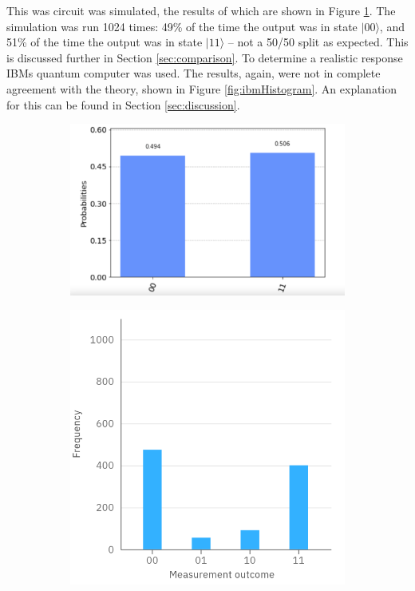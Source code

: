 This was circuit was simulated, the results of which are shown in Figure \ref{fig:qiskitHistogram}. The simulation was run 1024 times: 49\% of the time the output was in state $|00\rangle$, and 51\% of the time the output was in state $|11\rangle$ -- not a 50/50 split as expected. This is discussed further in Section \ref{sec:comparison}. To determine a realistic response IBMs quantum computer was used. The results, again, were not in complete agreement with the theory, shown in Figure \ref{fig:ibmHistogram}. An explanation for this can be found in Section \ref{sec:discussion}.

\begin{figure}[h]
    \centering
    \begin{subfigure}[h]{0.5\textwidth}
        \includegraphics[width=\textwidth]{lab2/images/qiskitHistogram.png}
        \caption{} 
        \label{fig:qiskitHistogram}
    \end{subfigure}
    \hfill
    \begin{subfigure}[h]{0.43\textwidth}
        \includegraphics[width=\textwidth]{lab2/images/ibmHistogram.png}

\end{subfigure}
\end{figure}
